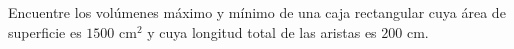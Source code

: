\item Encuentre los volúmenes máximo y mínimo de una caja rectangular cuya área de superficie es $1500 \text{ cm}^2$ y cuya longitud total de las aristas es $200 \text{ cm}$.

